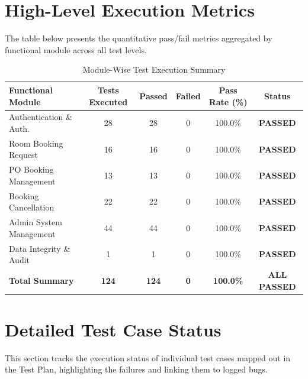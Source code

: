 \documentclass[11pt,a4paper]{article}
\begin{document}
\section{High-Level Execution Metrics}
The table below presents the quantitative pass/fail metrics aggregated by functional module across all test levels.

\begin{table}[h]
\centering
\caption{Module-Wise Test Execution Summary}
\label{tab:module_metrics}
\vspace{0.2cm}
\begin{tabularx}{\textwidth}{lccccc}
\toprule
\textbf{Functional Module} & \textbf{Tests Executed} & \textbf{Passed} & \textbf{Failed} & \textbf{Pass Rate (\%)} & \textbf{Status} \\ \midrule
Authentication \& Auth. & 28 & 28 & 0 & 100.0\% & \color{passgreenfg}\textbf{PASSED} \\
Room Booking Request & 16 & 16 & 0 & 100.0\% & \color{passgreenfg}\textbf{PASSED} \\
PO Booking Management & 13 & 13 & 0 & 100.0\% & \color{passgreenfg}\textbf{PASSED} \\
Booking Cancellation & 22 & 22 & 0 & 100.0\% & \color{passgreenfg}\textbf{PASSED} \\
Admin System Management & 44 & 44 & 0 & 100.0\% & \color{passgreenfg}\textbf{PASSED} \\
Data Integrity \& Audit & 1 & 1 & 0 & 100.0\% & \color{passgreenfg}\textbf{PASSED} \\ \midrule
\textbf{Total Summary} & \textbf{124} & \textbf{124} & \textbf{0} & \textbf{100.0\%} & \color{passgreenfg}\textbf{ALL PASSED} \\
\bottomrule
\end{tabularx}
\end{table}

\newpage
\section{Detailed Test Case Status}
This section tracks the execution status of individual test cases mapped out in the Test Plan, highlighting the failures and linking them to logged bugs.
\end{document}
